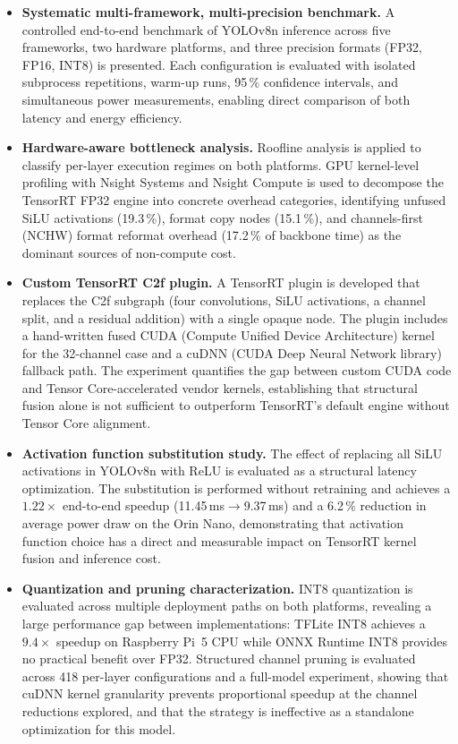 \documentclass[12pt,a4paper]{report}
\begin{document}
\begin{itemize}

\item \textbf{Systematic multi-framework, multi-precision benchmark.}
A controlled end-to-end benchmark of YOLOv8n inference across five frameworks, two hardware platforms, and three
precision formats (FP32, FP16, INT8) is presented.
Each configuration is evaluated with isolated subprocess repetitions, warm-up runs, 95\,\% confidence intervals, and
simultaneous power measurements, enabling direct comparison of both latency and energy efficiency.

\item \textbf{Hardware-aware bottleneck analysis.}
Roofline analysis is applied to classify per-layer execution regimes on both platforms.
GPU kernel-level profiling with Nsight Systems and Nsight Compute is used to decompose the TensorRT FP32 engine into
concrete overhead categories, identifying unfused SiLU activations (19.3\,\%), format copy nodes (15.1\,\%), and
channels-first (NCHW) format reformat overhead (17.2\,\% of backbone time) as the dominant sources of non-compute cost.

\item \textbf{Custom TensorRT C2f plugin.}
A TensorRT plugin is developed that replaces the C2f subgraph (four convolutions, SiLU activations, a channel split,
and a residual addition) with a single opaque node.
The plugin includes a hand-written fused CUDA (Compute Unified Device Architecture) kernel for the 32-channel case and a cuDNN (CUDA Deep Neural Network library) fallback path.
The experiment quantifies the gap between custom CUDA code and Tensor Core-accelerated vendor kernels, establishing that
structural fusion alone is not sufficient to outperform TensorRT's default engine without Tensor Core alignment.

\item \textbf{Activation function substitution study.}
The effect of replacing all SiLU activations in YOLOv8n with ReLU is evaluated as a structural latency optimization.
The substitution is performed without retraining and achieves a $1.22\times$ end-to-end speedup (11.45\,ms$\to$9.37\,ms)
and a 6.2\,\% reduction in average power draw on the Orin Nano, demonstrating that activation function choice has a
direct and measurable impact on TensorRT kernel fusion and inference cost.

\item \textbf{Quantization and pruning characterization.}
INT8 quantization is evaluated across multiple deployment paths on both platforms, revealing a large performance gap
between implementations: TFLite INT8 achieves a $9.4\times$ speedup on Raspberry Pi~5 CPU while ONNX Runtime INT8
provides no practical benefit over FP32.
Structured channel pruning is evaluated across 418 per-layer configurations and a full-model experiment, showing that
cuDNN kernel granularity prevents proportional speedup at the channel reductions explored, and that the strategy is
ineffective as a standalone optimization for this model.

\end{itemize}
\end{document}
